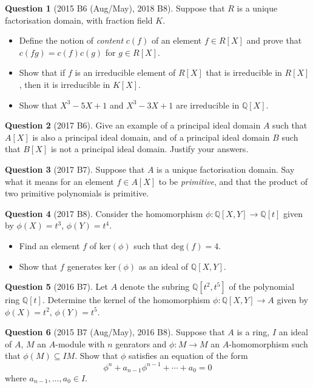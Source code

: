 \documentclass{article}
\numberwithin{equation}{section}
\theoremstyle{definition}
\newtheorem{quest}{Question}
\newcommand{\Q}{\mathbb{Q}}
\renewcommand{\.}{\,.}
\begin{document}
\begin{quest}[2015 B6 (Aug/May), 2018 B8]
Suppose that $R$ is a unique factorisation domain, with fraction field $K$. 
\begin{itemize}
\item Define the notion of \textit{content} $c(f)$ of an element $f\in R[X]$ and prove that $c(fg)=c(f)c(g)$ for $g\in R[X]$.
\item Show that if $f$ is an irreducible element of $R[X]$ that is irreducible in $R[X]$, then it is irreducible in $K[X]$.
\item Show that $X^3-5X+1$ and $X^3-3X+1$ are irreducible in $\Q[X]$.
\end{itemize}
\end{quest}

\begin{quest}[2017 B6]
Give an example of a principal ideal domain $A$ such that $A[X]$ is also a principal ideal domain, and of a principal ideal domain $B$ such that $B[X]$ is not a principal ideal domain. Justify your answers.
\end{quest}

\begin{quest}[2017 B7]
Suppose that $A$ is a unique factorisation domain. Say what it means for an element $f\in A[X]$ to be \textit{primitive}, and that the product of two primitive polynomials is primitive.
\end{quest}

\begin{quest}[2017 B8]
Consider the homomorphism $\phi: \Q[X,Y] \to \Q[t]$ given by $\phi(X)=t^3$, $\phi(Y)=t^4$.
\begin{itemize}
\item Find an element $f$ of $\text{ker}(\phi)$ such that $\text{deg}(f)=4$.
\item Show that $f$ generates $\text{ker}(\phi)$ as an ideal of $\Q[X,Y]$.
\end{itemize}
\end{quest}

\begin{quest}[2016 B7]
Let $A$ denote the subring $\Q[t^2,t^5]$ of the polynomial ring $\Q[t]$. Determine the kernel of the homomorphism $\phi: \Q[X,Y]\to A$ given by $\phi(X)=t^2$, $\phi(Y)=t^5$.
\end{quest}

\begin{quest}[2015 B7 (Aug/May), 2016 B8]
Suppose that $A$ is a ring, $I$ an ideal of $A$, $M$ an $A$-module with $n$ genrators and $\phi: M\to M$ an $A$-homomorphism such that $\phi(M)\subseteq IM$. Show that $\phi$ satisfies an equation of the form
\begin{equation*}
\phi^n + a_{n-1}\phi^{n-1} + \cdots +a_0 = 0
\end{equation*}
where $a_{n-1},\ldots , a_0\in I$.
\end{quest}
\end{document}
